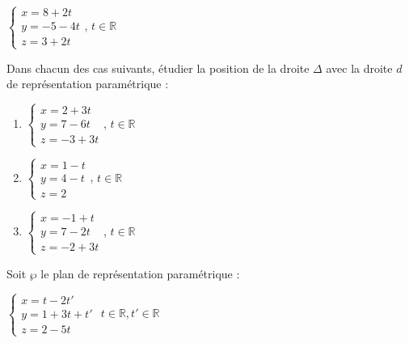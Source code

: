 \begin{colonne*exercice}
\begin{exercice}
  \begin{center}
    $\begin{cases}x=8+2t \\y=-5-4t \\z=3+2t \end{cases}$,
    $t\in\mathbb{R}$
  \end{center}

  Dans chacun des cas suivants, étudier la position de la droite
  $\Delta$ avec la droite $d$ de représentation paramétrique :
  \begin{enumerate}
  \item \begin{center}
      $\begin{cases}x=2+3t\\y=7-6t \\z=-3+3t\end{cases}$,
      $t\in\mathbb{R}$
    \end{center}
  \item \begin{center} $\begin{cases}x=1-t \\y=4-t \\z=2 \end{cases}$, $t\in\mathbb{R}$
    \end{center}
  \item \begin{center}
      $\begin{cases}x=-1+t \\y=7-2t \\z=-2+3t \end{cases}$,
      $t\in\mathbb{R}$
    \end{center}
  \end{enumerate}
\end{exercice}

\begin{exercice}
  Soit $\wp$ le plan de représentation paramétrique :

\begin{center}
  $\begin{cases}x=t-2t' \\y=1+3t+t' \\z=2-5t \end{cases}$
  $t\in\mathbb{R}, t'\in\mathbb{R}$
\end{center}


\end{exercice}
\end{colonne*exercice}
